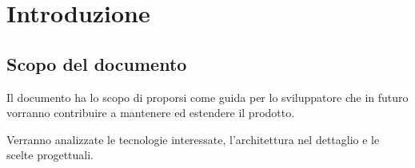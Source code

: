 \section{Introduzione}



\subsection{Scopo del documento}

Il documento ha lo scopo di proporsi come guida per lo sviluppatore che in futuro
vorranno contribuire a mantenere ed estendere il prodotto.

Verranno analizzate le tecnologie interessate, l'architettura nel dettaglio e le scelte
progettuali.


